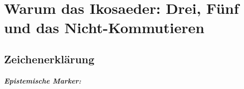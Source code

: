 
\providecommand{\BM}{\textbf{[B]}}
\providecommand{\KM}{\textbf{[K]}}
\providecommand{\SM}{\textbf{[S]}}
\providecommand{\EM}{\textbf{[E]}}

\chapter*{Warum das Ikosaeder: Drei, Fünf und das Nicht-Kommutieren}

\begin{abstract}
FFGFT ist von Grund auf eine $\mathbb{Z}_3$-Theorie. Die Leptonmassen enthalten
aber den goldenen Schnitt $\phi$, und $\phi$ ist die Zahl der Fünf. Dieses
Dokument erklärt, warum das Ikosaeder die Brücke ist: seine Drehgruppe $A_5$ ist
die kleinste endliche Gruppe, in der eine Drei und eine Fünf zusammen vorkommen,
ohne miteinander zu vertauschen. Aus diesem Nicht-Vertauschen entsteht eine
Mischung der $\mathbb{Z}_3$-Moden unter der Fünffachdrehung, und die Mischung
hat eine rationale Komponente $2/9$ und zwei $\phi$-haltige Komponenten. Die
rationale ist die Koide-Phase (Dok.~367), die $\phi$-haltigen sind das Skelett
der Massenverhältnisse (Dok.~368). Ein einziges Matrixelement dieser Mischung
trägt die gesamte Koide-Formel. Das Dokument rechnet nichts Neues; es erzählt,
was die Dokumente 285, 293, 367 und 368 zusammen bedeuten.
\end{abstract}

\section*{Zeichenerklärung}

\paragraph*{Epistemische Marker:}\mbox{}\\[2pt]



